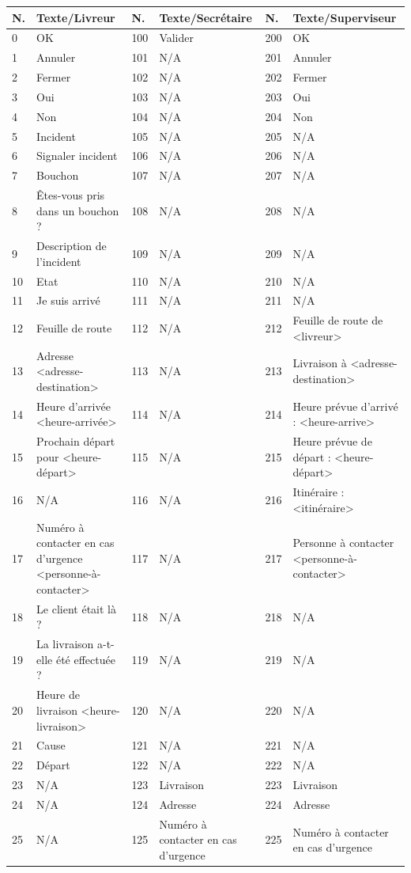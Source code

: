 \documentclass{report}
\begin{document}
\begin{longtable}{|p{0.5cm}|p{3.5cm}|p{0.5cm}|p{3.5cm}|p{0.5cm}|p{3.5cm}|}
\hline
N.&Texte/Livreur&N.&Texte/Secrétaire&N.&Texte/Superviseur\\\hline
0&OK&100&Valider&200&OK\\\hline
1&Annuler&101&N/A&201&Annuler\\\hline
2&Fermer&102&N/A&202&Fermer\\\hline
3&Oui&103&N/A&203&Oui\\\hline
4&Non&104&N/A&204&Non\\\hline
5&Incident&105&N/A&205&N/A\\\hline
6&Signaler incident&106&N/A&206&N/A\\\hline
7&Bouchon&107&N/A&207&N/A\\\hline
8&Êtes-vous pris dans un bouchon ?&108&N/A&208&N/A\\\hline
9&Description de l'incident&109&N/A&209&N/A\\\hline
10&Etat&110&N/A&210&N/A\\\hline
11&Je suis arrivé&111&N/A&211&N/A\\\hline
12&Feuille de route&112&N/A&212&Feuille de route de <livreur>\\\hline
13&Adresse <adresse-destination>&113&N/A&213&Livraison à <adresse-destination>\\\hline
14&Heure d'arrivée <heure-arrivée>&114&N/A&214&Heure prévue d'arrivé : <heure-arrive>\\\hline
15&Prochain départ pour <heure-départ>&115&N/A&215&Heure prévue de départ : <heure-départ>\\\hline
16&N/A&116&N/A&216&Itinéraire : <itinéraire>\\\hline
17&Numéro à contacter en cas d'urgence <personne-à-contacter>&117&N/A&217&Personne à contacter <personne-à-contacter>\\\hline
18&Le client était là ?&118&N/A&218&N/A\\\hline
19&La livraison a-t-elle été effectuée ?&119&N/A&219&N/A\\\hline
20&Heure de livraison <heure-livraison>&120&N/A&220&N/A\\\hline
21&Cause&121&N/A&221&N/A\\\hline
22&Départ&122&N/A&222&N/A\\\hline
23&N/A&123&Livraison&223&Livraison\\\hline
24&N/A&124&Adresse&224&Adresse\\\hline
25&N/A&125&Numéro à contacter en cas d'urgence&225&Numéro à contacter en cas d'urgence\\\hline

\end{longtable}
\end{document}
